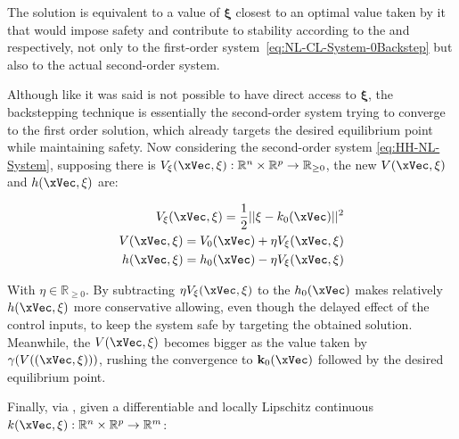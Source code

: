 The solution is equivalent to a value of \(\mathbf{\xi}\) closest to an optimal value taken by it that would impose safety and contribute to stability according to the  and  respectively, not only to the first-order system~\eqref{eq:NL-CL-System-0Backstep} but also to the actual second-order system.\par
Although like it was said is not possible to have direct access to \(\mathbf{\xi}\), the backstepping technique is essentially the second-order system trying to converge to the first order solution, which already targets the desired equilibrium point while maintaining  safety. Now considering the second-order system \eqref{eq:HH-NL-System}, supposing there is \( V_{\mathbf{\xi}}(\xVec, \mathbf{\xi}): \mathbb{R}^n \times \mathbb{R}^p \rightarrow \mathbb{R}_{\geq 0} \), the new  \(V(\xVec, \mathbf{\xi})\) and  \(h(\xVec, \mathbf{\xi})\) are:

\begin{subequations}
    \label{eq:Backstepp_CF}
    \begin{align}
        V_{\mathbf{\xi}}(\xVec, \mathbf{\xi}) = \frac{1}{2}|| \mathbf{\xi} -  k_0(\xVec) ||^2 
        \label{eq:Backstepp_prejudice}\\
        V(\xVec, \mathbf{\xi}) = V_0(\xVec) + \eta V_{\mathbf{\xi}}(\xVec, \mathbf{\xi}) 
        \label{eq:Backstepp_V}\\
        h(\xVec, \mathbf{\xi}) = h_0(\xVec) - \eta V_{\mathbf{\xi}}(\xVec, \mathbf{\xi})
        \label{eq:Backstepp_h}
    \end{align}
\end{subequations}


With \(\eta \in \mathbb{R}_{\geq 0}\). By subtracting \(\eta V_{\mathbf{\xi}}(\xVec, \mathbf{\xi})\) to the  \(h_0(\xVec)\) makes relatively \(h(\xVec, \xi)\) more conservative allowing, even though the delayed effect of the control inputs, to keep the system safe by targeting the obtained solution. Meanwhile, the  \(V(\xVec, \xi)\) becomes bigger as the value taken by \(\gamma(V((\xVec, \xi)))\), rushing the convergence to \(\mathbf{k}_0(\xVec)\) followed by the desired equilibrium point. \par
Finally, via , given a differentiable and locally Lipschitz continuous  \(k(\xVec, \mathbf{\xi}):\mathbb{R}^n \times \mathbb{R}^p \to \mathbb{R}^m\):

